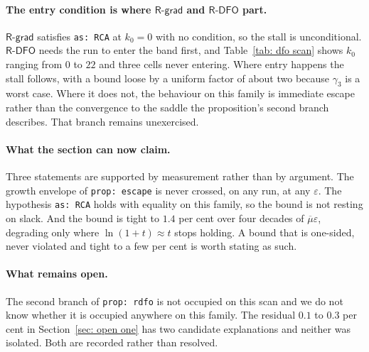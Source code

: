 \documentclass[11pt,a4paper]{article}
\providecommand{\Rdfo}{\textsf{R-DFO}}
\providecommand{\Rgrad}{\textsf{R-grad}}
\providecommand{\gthree}{\gamma_3}
\theoremstyle{definition}
\theoremstyle{remark}
\begin{document}
\paragraph{The entry condition is where $\Rgrad$ and $\Rdfo$ part.}
$\Rgrad$ satisfies \texttt{as: RCA} at $k_0 = 0$ with no condition, so the stall
is unconditional. $\Rdfo$ needs the run to enter the band first, and
Table~\ref{tab: dfo scan} shows $k_0$ ranging from $0$ to $22$ and three cells
never entering. Where entry happens the stall follows, with a bound loose by a
uniform factor of about two because $\gthree$ is a worst case. Where it does not,
the behaviour on this family is immediate escape rather than the convergence to
the saddle the proposition's second branch describes. That branch remains
unexercised.

\paragraph{What the section can now claim.}
Three statements are supported by measurement rather than by argument. The growth
envelope of \texttt{prop: escape} is never crossed, on any run, at any
$\varepsilon$. The hypothesis \texttt{as: RCA} holds with equality on this
family, so the bound is not resting on slack. And the bound is tight to $1.4$ per
cent over four decades of $\overline{\mu}\varepsilon$, degrading only where
$\ln(1+t) \approx t$ stops holding. A bound that is one-sided, never violated and
tight to a few per cent is worth stating as such.

\paragraph{What remains open.}
The second branch of \texttt{prop: rdfo} is not occupied on this scan and we do
not know whether it is occupied anywhere on this family. The residual $0.1$ to
$0.3$ per cent in Section~\ref{sec: open one} has two candidate explanations and
neither was isolated. Both are recorded rather than resolved.
\end{document}
